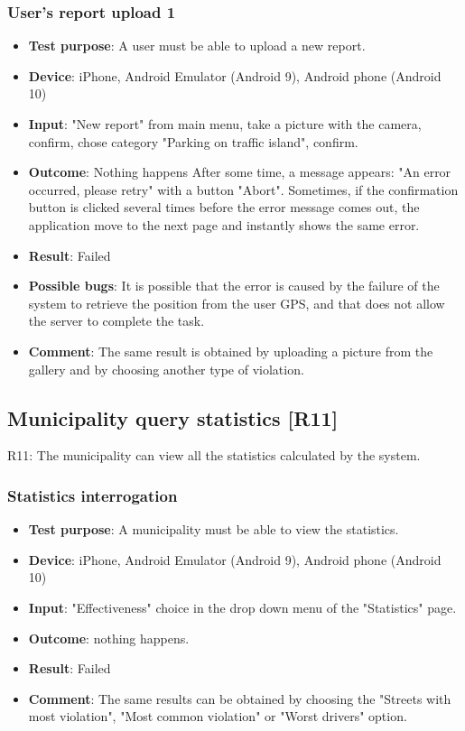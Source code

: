 \documentclass[../ATD.tex]{subfiles}
\begin{document}
    \subsubsection{User's report upload 1}\label{subsubsec:user-report-upload-1}
    \begin{itemize}
        \item \textbf{Test purpose}: A user must be able to upload a new report.
        \item \textbf{Device}: iPhone, Android Emulator (Android 9), Android phone (Android 10)
        \item \textbf{Input}: "New report" from main menu, take a picture with the camera, confirm, chose category "Parking on traffic island", confirm.
        \item \textbf{Outcome}: Nothing happens
        After some time, a message appears: "An error occurred, please retry" with a button "Abort".
        Sometimes, if the confirmation button is clicked several times before the error message comes out, the application move to the next page and instantly shows the same error.
        \item \textbf{Result}: Failed
        \item \textbf{Possible bugs}: It is possible that the error is caused by the failure of the system to retrieve the position from the user GPS, and that does not allow the server to complete the task.
        \item \textbf{Comment}: The same result is obtained by uploading a picture from the gallery and by choosing another type of violation.
    \end{itemize}

    \subsection{Municipality query statistics [R11]}\label{subsec:municipality-query-statistics}
    R11: The municipality can view all the statistics calculated by the system.

    \subsubsection{Statistics interrogation}\label{subsubsec:statistics-interrogation}
    \begin{itemize}
        \item \textbf{Test purpose}: A municipality must be able to view the statistics.
        \item \textbf{Device}: iPhone, Android Emulator (Android 9), Android phone (Android 10)
        \item \textbf{Input}: "Effectiveness" choice in the drop down menu of the "Statistics" page.
        \item \textbf{Outcome}: nothing happens.
        \item \textbf{Result}: Failed
        \item \textbf{Comment}: The same results can be obtained by choosing the "Streets with most violation", "Most common violation" or "Worst drivers" option.
    \end{itemize}
\end{document}
